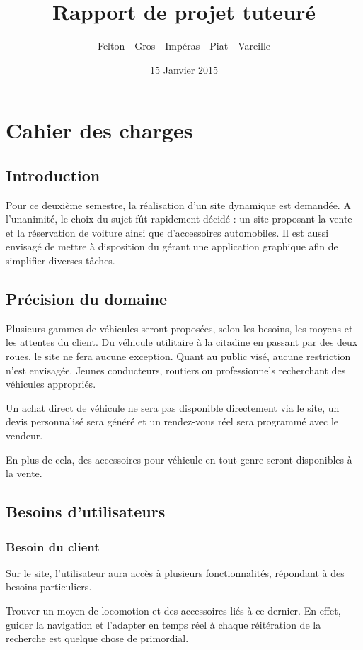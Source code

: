 \documentclass[a4paper]{article}
\title{\Huge \textbf{Rapport de projet tuteuré}}
\author{\Large Felton - Gros - Impéras - Piat - Vareille}
\date{15 Janvier 2015}
\begin{document}
\maketitle
\newpage

\tableofcontents
\newpage

\section{Cahier des charges}
	\subsection*{Introduction}
	
	Pour ce deuxième semestre, la réalisation d'un site dynamique est demandée. A l'unanimité, le choix du sujet fût rapidement décidé : un site proposant la vente et la réservation de voiture ainsi que d'accessoires automobiles. Il est aussi envisagé de mettre à disposition du gérant une application graphique afin de simplifier diverses tâches.
	\subsection{Précision du domaine}
	
	Plusieurs gammes de véhicules seront proposées, selon les besoins, les moyens et les attentes du client. Du véhicule utilitaire à la citadine en passant par des deux roues, le site ne fera aucune exception. Quant au public visé, aucune restriction n'est envisagée. Jeunes conducteurs, routiers ou professionnels recherchant des véhicules appropriés.
	
	Un achat direct de véhicule ne sera pas disponible directement via le site, un devis personnalisé sera généré et un rendez-vous réel sera programmé avec le vendeur.
	
	En plus de cela, des accessoires pour véhicule en tout genre seront disponibles à la vente.
	\subsection{Besoins d'utilisateurs}
		\subsubsection{Besoin du client}
	Sur le site, l'utilisateur aura accès à plusieurs fonctionnalités, répondant à des besoins particuliers.
	
	Trouver un moyen de locomotion et des accessoires liés à ce-dernier.
	En effet, guider la navigation et l'adapter en temps réel à chaque réitération de la recherche est quelque chose de primordial. 
	
\end{document}
